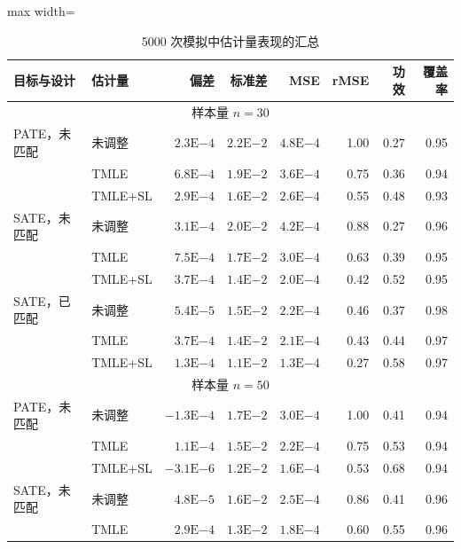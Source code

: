 \begin{table}[htbp]
\centering
\caption{5000 次模拟中估计量表现的汇总}
\label{tab:ch12-performance}
\begingroup
\small
\setlength{\tabcolsep}{3pt}
\begin{adjustbox}{max width=\textwidth}
\begin{tabular}{@{}llrrrrrr@{}}
\toprule
目标与设计 & 估计量 & 偏差 & 标准差 & MSE & rMSE & 功效 & 覆盖率 \\
\midrule
\multicolumn{8}{c}{样本量 $n=30$} \\
PATE，未匹配 & 未调整 & $2.3\mathrm E{-4}$ & $2.2\mathrm E{-2}$ & $4.8\mathrm E{-4}$ & 1.00 & 0.27 & 0.95 \\
 & TMLE & $6.8\mathrm E{-4}$ & $1.9\mathrm E{-2}$ & $3.6\mathrm E{-4}$ & 0.75 & 0.36 & 0.94 \\
 & TMLE+SL & $2.9\mathrm E{-4}$ & $1.6\mathrm E{-2}$ & $2.6\mathrm E{-4}$ & 0.55 & 0.48 & 0.93 \\
SATE，未匹配 & 未调整 & $3.1\mathrm E{-4}$ & $2.0\mathrm E{-2}$ & $4.2\mathrm E{-4}$ & 0.88 & 0.27 & 0.96 \\
 & TMLE & $7.5\mathrm E{-4}$ & $1.7\mathrm E{-2}$ & $3.0\mathrm E{-4}$ & 0.63 & 0.39 & 0.95 \\
 & TMLE+SL & $3.7\mathrm E{-4}$ & $1.4\mathrm E{-2}$ & $2.0\mathrm E{-4}$ & 0.42 & 0.52 & 0.95 \\
SATE，已匹配 & 未调整 & $5.4\mathrm E{-5}$ & $1.5\mathrm E{-2}$ & $2.2\mathrm E{-4}$ & 0.46 & 0.37 & 0.98 \\
 & TMLE & $3.7\mathrm E{-4}$ & $1.4\mathrm E{-2}$ & $2.1\mathrm E{-4}$ & 0.43 & 0.44 & 0.97 \\
 & TMLE+SL & $1.3\mathrm E{-4}$ & $1.1\mathrm E{-2}$ & $1.3\mathrm E{-4}$ & 0.27 & 0.58 & 0.97 \\
\midrule
\multicolumn{8}{c}{样本量 $n=50$} \\
PATE，未匹配 & 未调整 & $-1.3\mathrm E{-4}$ & $1.7\mathrm E{-2}$ & $3.0\mathrm E{-4}$ & 1.00 & 0.41 & 0.94 \\
 & TMLE & $1.1\mathrm E{-4}$ & $1.5\mathrm E{-2}$ & $2.2\mathrm E{-4}$ & 0.75 & 0.53 & 0.94 \\
 & TMLE+SL & $-3.1\mathrm E{-6}$ & $1.2\mathrm E{-2}$ & $1.6\mathrm E{-4}$ & 0.53 & 0.68 & 0.94 \\
SATE，未匹配 & 未调整 & $4.8\mathrm E{-5}$ & $1.6\mathrm E{-2}$ & $2.5\mathrm E{-4}$ & 0.86 & 0.41 & 0.96 \\
 & TMLE & $2.9\mathrm E{-4}$ & $1.3\mathrm E{-2}$ & $1.8\mathrm E{-4}$ & 0.60 & 0.55 & 0.96 \\

\end{tabular}
\end{adjustbox}
\end{table}
